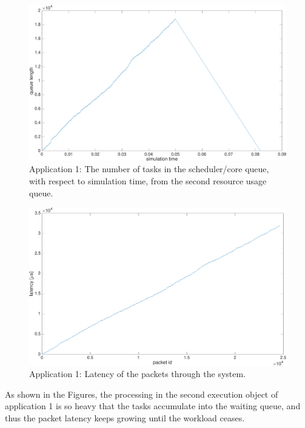 \begin{figure}[]
  \begin{center}
    \includegraphics[width=\textwidth]{images/experiment/app1-queue2.pdf}
    \caption{Application 1: The number of tasks in the scheduler/core queue, with respect to simulation time, from the second resource usage queue.}
    \label{fig:app1-queue2}
  \end{center}
\end{figure}

\begin{figure}[]
  \begin{center}
    \includegraphics[width=\textwidth]{images/experiment/app1-latency.pdf}
    \caption{Application 1: Latency of the packets through the system.}
    \label{fig:app1-latency}
  \end{center}
\end{figure}

As shown in the Figures, the processing in the second execution object of application 1 is so heavy that the tasks accumulate into the waiting queue, and thus the packet latency keeps growing until the workload ceases.

